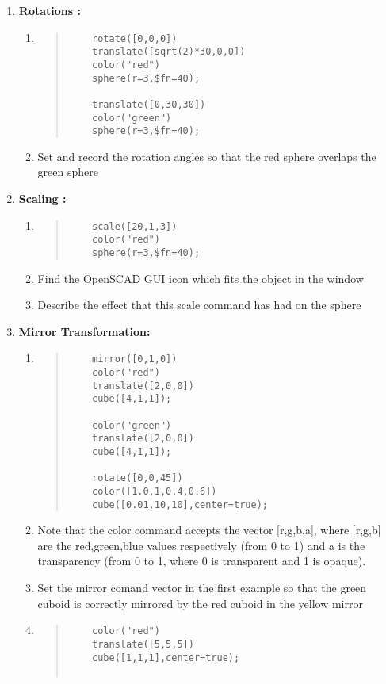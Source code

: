 \begin{enumerate}
 \item \textbf{Rotations :} 
 \begin{enumerate}
 \item[ ]
 \begin{quote}
  \begin{verbatim}
    rotate([0,0,0]) 
    translate([sqrt(2)*30,0,0]) 
    color("red") 
    sphere(r=3,$fn=40);
    
    translate([0,30,30]) 
    color("green") 
    sphere(r=3,$fn=40);
 \end{verbatim}
 \end{quote}
 \item Set and record the rotation angles so that the red sphere overlaps the green sphere
 \end{enumerate}
 
 \item \textbf{Scaling :} 
 \begin{enumerate}
 \item[ ]
 \begin{quote}
  \begin{verbatim}
    scale([20,1,3])
    color("red")
    sphere(r=3,$fn=40);
  \end{verbatim}
 \end{quote}
  \item Find the OpenSCAD GUI icon which fits the object in the window
  \item Describe the effect that this scale command has had on the sphere
\end{enumerate}
 
 \item \textbf{Mirror Transformation:} 
 \begin{enumerate}
 \item[ ]
 \begin{quote}
 \begin{verbatim}
    mirror([0,1,0])
    color("red")
    translate([2,0,0])
    cube([4,1,1]);
    
    color("green")
    translate([2,0,0])
    cube([4,1,1]);
    
    rotate([0,0,45]) 
    color([1.0,1,0.4,0.6]) 
    cube([0.01,10,10],center=true);
 \end{verbatim}
 \end{quote}
 \item Note that the color command accepts the vector [r,g,b,a], where [r,g,b] are the red,green,blue values respectively (from 0 to 1) and a is the transparency (from 0 to 1, where 0 is transparent and 1 is opaque). 
 \item Set the mirror comand vector in the first example so that the green cuboid is correctly mirrored by the red cuboid in the yellow mirror
 \item[ ]
 \begin{quote}
 \begin{verbatim}
    color("red") 
    translate([5,5,5]) 
    cube([1,1,1],center=true);
    

\end{verbatim}
\end{quote}
\end{enumerate}
\end{enumerate}
